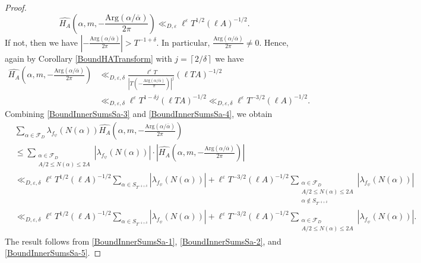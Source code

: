 \documentclass[11pt]{amsart}
\theoremstyle{definition}
\theoremstyle{remark}
\begin{document}
\begin{proof}
\begin{equation}
    \widehat{H_A}\left(\alpha,m,-\frac{\mathrm{Arg}(\alpha/\overline{\alpha})}{2 \pi} \right) \ll_{D,\varepsilon} \ell^{\varepsilon} T^{1/2} (\ell A)^{-1/2}. \label{BoundInnerSumsSa-3}
\end{equation}
If not, then we have $\left|-\frac{\mathrm{Arg}(\alpha/\overline{\alpha})}{2 \pi} \right| > T^{-1+\delta}$. In particular, $\frac{\mathrm{Arg}(\alpha/\overline{\alpha})}{2 \pi} \neq 0$. Hence, again by Corollary \ref{BoundHATransform} with $j=\left\lceil 2/\delta \right\rceil$ we have 
\begin{align}
    \widehat{H_A}\left(\alpha,m,-\frac{\mathrm{Arg}(\alpha/\overline{\alpha})}{2\pi} \right) &\ll_{D,\varepsilon,\delta} \frac{\ell^{\varepsilon} T}{\left| T\left( -\frac{\mathrm{Arg}(\alpha/\overline{\alpha})}{\pi} \right) \right|^{j}}  (\ell TA)^{-1/2} \label{BoundInnerSumsSa-4} \\
    &\ll_{D,\varepsilon,\delta} \ell^{\varepsilon} T^{1-\delta j} (\ell TA)^{-1/2} \ll_{D,\varepsilon,\delta} \ell^{\varepsilon} T^{-3/2} (\ell A)^{-1/2}. \nonumber
\end{align}
Combining \eqref{BoundInnerSumsSa-3} and \eqref{BoundInnerSumsSa-4}, we obtain
\begin{align}
    &\sum_{\alpha \in \mathcal{F}_{D}} \lambda_{f_{\psi}}(N(\alpha)) \widehat{H_A}\left( \alpha,m,-\frac{\mathrm{Arg}(\alpha/\overline{\alpha})}{2 \pi} \right) \label{BoundInnerSumsSa-5} \\
    &\leq \sum_{\substack{\alpha \in \mathcal{F}_{D} \\ A/2 \leq N(\alpha) \leq 2A}} |\lambda_{f_{\psi}}(N(\alpha))| \cdot \left| \widehat{H_A}\left( \alpha,m,-\frac{\mathrm{Arg}(\alpha/\overline{\alpha})}{2 \pi} \right) \right| \nonumber \\
    &\ll_{D,\varepsilon, \delta} \ell^{\varepsilon} T^{1/2} (\ell A)^{-1/2} \sum_{\alpha\in S_{T^{-1+\delta}}} |\lambda_{f_{\psi}}(N(\alpha))| + \ell^{\varepsilon} T^{-3/2} (\ell A)^{-1/2} \sum_{\substack{\alpha \in \mathcal{F}_{D} \\ A/2 \leq N(\alpha) \leq 2A \\ \alpha \notin S_{T^{-1+\delta}} }} |\lambda_{f_{\psi}}(N(\alpha))| \nonumber \\
    &\ll_{D,\varepsilon, \delta} \ell^{\varepsilon} T^{1/2} (\ell A)^{-1/2} \sum_{\alpha\in S_{T^{-1+\delta}}} |\lambda_{f_{\psi}}(N(\alpha))| + \ell^{\varepsilon} T^{-3/2} (\ell A)^{-1/2} \sum_{\substack{\alpha \in \mathcal{F}_{D} \\ A/2 \leq N(\alpha) \leq 2A}} |\lambda_{f_{\psi}}(N(\alpha))|. \nonumber
\end{align}
The result follows from \eqref{BoundInnerSumsSa-1}, \eqref{BoundInnerSumsSa-2}, and \eqref{BoundInnerSumsSa-5}.
\end{proof}
\end{document}
